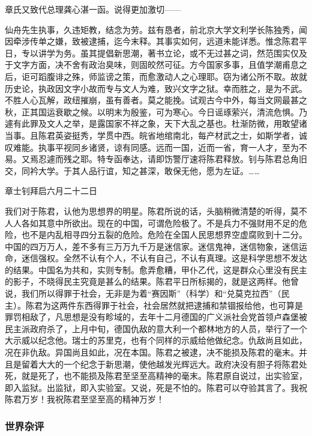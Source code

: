 章氏又致代总理龚心湛一函。说得更加激切——

仙舟先生执事，久违矩教，结念为劳。兹有恳者，前北京大学文利学长陈独秀，闻因牵涉传单之嫌，致被逮捕，迄今末释。其事实如何，远道未能详悉。惟念陈君平日，专以讲学为务。虽其提倡新思潮，著书立论，或不无过甚之词，然范围实仅及于文字方面，决不舍有政治臭味，则固皎然可征。方今国家多事，且值学潮甫息之后，讵可蹈腹诽之殊，师监谤之策，而愈激动人之心理耶。窃为诸公所不取。故就历史论，执政因文字小故而专与文人为难，致兴文字之狱。幸而胜之，是为不武。不胜人心瓦解，政纽摧崩，虽有善者。莫之能挽。试观古今中外，每当文网最甚之秋，正其国运衰歇之候。以明末为殷鉴，可为寒心。今日谣琢萦兴，清流危惧。乃遽有此罪及文人之举，是露国家不祥之象，天下大乱之基也。杜渐防微，用敢望诸当事。且陈君英姿挺秀，学贯中西。皖省地绾南北，每产材武之士，如斯学者，诚叹难能。执事平视同乡诸贤，谅有同感。远而一国，近而一省，育一人才，至为不易。又焉忍遽而残之耶。特专函奉达，请即饬警厅速将陈君释放。钊与陈君总角旧交，同衿大学。于其人品行谊，知之甚深，敢保无他，愿为左证。……

\begin{flushright}章士钊拜启六月二十二日\end{flushright}

我们对于陈君，认他为思想界的明星。陈君所说的话，头脑稍微清楚的听得，莫不人人各如其意中所欲出。现在的中国，可谓危险极了。不是兵力不强财用不足的危险，也不是内乱相寻四分五裂的危险。危险在全国人民思想界空虚腐败到十二分。中国的四万万人，差不多有三万万九千万是迷信家。迷信鬼神，迷信物象，迷信运命，迷信强权。全然不认有个人，不认有自己，不认有真理。这是科学思想不发达的结果。中国名为共和，实则专制。愈弄愈糟，甲仆乙代，这是群众心里没有民主的影子，不晓得民主究竟是甚么的结果。陈君平日所标揭的，就是这两样。他曾说，我们所以得罪于社会，无非是为着“赛因斯”（科学）和“兑莫克拉西”（民主）。陈君为这两件东西得罪于社会，社会居然就把逮捕和禁锢报给他，也可算是罪罚相敌了，凡思想是没有畛域的，去年十二月德国的广义派社会党首领卢森堡被民主派政府杀了，上月中旬，德国仇敌的意大利一个都林地方的人员，举行了一个大示威以纪念他。瑞士的苏里克，也有个同样的示威给他做纪念。仇敌尚且如此，况在非仇敌。异国尚且如此，况在本国。陈君之被逮，决不能损及陈君的毫末。并且是留着大大的一个纪念于新思潮，使他越发光辉远大。政府决没有胆子将陈君处死，就是死了，也不能损及陈君至坚至高精神的毫末。陈君原自说过，出实验室，即入监狱。出监狱，即入实验室。又说，死是不怕的。陈君可以夺验其言了。我祝陈君万岁！我祝陈君至坚至高的精神万岁！

\subsubsection{世界杂评}

